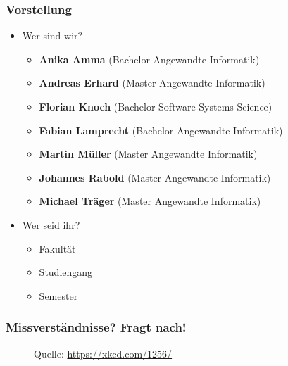 \documentclass[10pt,
\lang ,
\handoutmode ,
compress
]{beamer}
\begin{document}
  {
  	\frametitle{Vorstellung}
     \begin{itemize}
 	    \item Wer sind wir?
 	    \begin{itemize}
        \item \textbf{Anika Amma} (Bachelor Angewandte Informatik)
        \item \textbf{Andreas Erhard} (Master Angewandte Informatik)
        \item \textbf{Florian Knoch} (Bachelor Software Systems Science)
        \item \textbf{Fabian Lamprecht} (Bachelor Angewandte Informatik)
        \item \textbf{Martin Müller} (Master Angewandte Informatik)
        \item \textbf{Johannes Rabold} (Master Angewandte Informatik)
        \item \textbf{Michael Träger} (Master Angewandte Informatik)
 	    \end{itemize}
 	    \medskip
 	    \item Wer seid ihr?
 	    \begin{itemize}
	 	    \item Fakultät
	 	    \item Studiengang
	 	    \item Semester
 	    \end{itemize}
     \end{itemize}
  }

\begin{frame}{\contentsname}
    \frametitle{Missverständnisse? Fragt nach!}
    \begin{figure}
      \centering
        \caption{\small Quelle: \url{https://xkcd.com/1256/}}
    \end{figure}
\end{frame}
\end{document}
